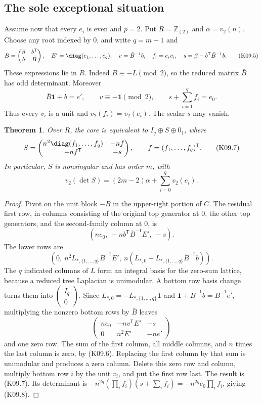\documentclass[11pt,a4paper]{article}
\newtheorem{theorem}{Theorem}[section]
\theoremstyle{definition}\newtheorem{definition}[theorem]{Definition}
\theoremstyle{remark}\newtheorem{remark}[theorem]{Remark}
\newcommand{\Z}{\mathbb Z}\newcommand{\Q}{\mathbb Q}\newcommand{\F}{\mathbb F}
\numberwithin{equation}{section}
\begin{document}
\subsection{The sole exceptional situation}\label{K09-sec-3}
Assume now that every $e_i$ is even and $p=2$. Put $R=\Z_{(2)}$ and $\alpha=v_2(n)$. Choose any root indexed by $0$, and write $q=m-1$ and
\[
 B=\begin{pmatrix}\beta&b^{\mathsf T}\\b&\bar B\end{pmatrix},
 \quad E'=\diag(e_1,\ldots,e_q),\quad
 v=\bar B^{-1}b,\quad f_i=e_iv_i,
 \quad s=\beta-b^{\mathsf T}\bar B^{-1}b.                    \tag{K09.5}
\]
These expressions lie in $R$. Indeed $B\equiv-L\pmod2$, so the reduced matrix $\bar B$ has odd determinant. Moreover
\[
 \bar B\boldsymbol1+b=e',\qquad v\equiv-\boldsymbol1\pmod2,
 \qquad s+\sum_{i=1}^qf_i=e_0.                              \tag{K09.6}
\]
Thus every $v_i$ is a unit and $v_2(f_i)=v_2(e_i)$. The scalar $s$ may vanish.
\begin{theorem}\label{K09-arrow}
Over $R$, the core is equivalent to $I_q\oplus S\oplus0_1$, where
\[
 S=\begin{pmatrix}
 n^2\diag(f_1,\ldots,f_q)&-n f\\
 -n f^{\mathsf T}&-s
 \end{pmatrix},\qquad f=(f_1,\ldots,f_q)^{\mathsf T}.         \tag{K09.7}
\]
In particular, $S$ is nonsingular and has order $m$, with
\[
 v_2(\det S)=(2m-2)\alpha+\sum_{i=0}^qv_2(e_i).             \tag{K09.8}
\]
\end{theorem}
\begin{proof}
Pivot on the unit block $-\bar B$ in the upper-right portion of $C$. The residual first row, in columns consisting of the original top generator at $0$, the other top generators, and the second-family column at $0$, is
\[
 (ne_0,\ -n b^{\mathsf T}\bar B^{-1}E',\ -s).
\]
The lower rows are
\[
 (0,\ n^2 L_{*,\{1,\ldots,q\}}\bar B^{-1}E',\
 n(L_{*,0}-L_{*,\{1,\ldots,q\}}\bar B^{-1}b)).
\]
The $q$ indicated columns of $L$ form an integral basis for the zero-sum lattice, because a reduced tree Laplacian is unimodular. A bottom row basis change turns them into $\left(\begin{smallmatrix}I_q\\0\end{smallmatrix}\right)$. Since $L_{*,0}=-L_{*,\{1,\ldots,q\}}\boldsymbol1$ and $\boldsymbol1+\bar B^{-1}b=\bar B^{-1}e'$, multiplying the nonzero bottom rows by $\bar B$ leaves
\[
 \begin{pmatrix}
 ne_0&-n v^{\mathsf T}E'&-s\\
 0&n^2E'&-n e'
 \end{pmatrix}                                               \tag{K09.9}
\]
and one zero row. The sum of the first column, all middle columns, and $n$ times the last column is zero, by (K09.6). Replacing the first column by that sum is unimodular and produces a zero column. Delete this zero row and column, multiply bottom row $i$ by the unit $v_i$, and put the first row last. The result is (K09.7). Its determinant is
$-n^{2q}(\prod_i f_i)(s+\sum_i f_i)=-n^{2q}e_0\prod_i f_i$, giving (K09.8).
\end{proof}
\end{document}

